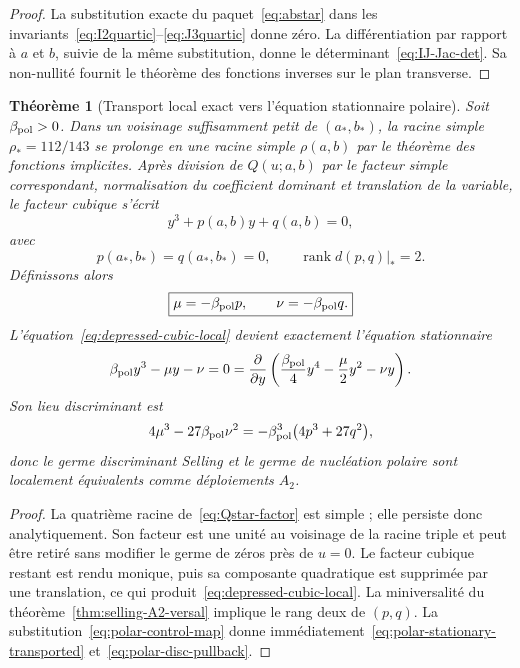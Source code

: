 \documentclass[11pt,a4paper]{article}
\newtheorem{theorem}{Théorème}[section]
\begin{document}
\begin{proof}
La substitution exacte du paquet~\eqref{eq:abstar} dans les invariants~\eqref{eq:I2quartic}--\eqref{eq:J3quartic} donne zéro. La différentiation par rapport à $a$ et $b$, suivie de la même substitution, donne le déterminant~\eqref{eq:IJ-Jac-det}. Sa non-nullité fournit le théorème des fonctions inverses sur le plan transverse.
\end{proof}

\begin{theorem}[Transport local exact vers l'équation stationnaire polaire]\label{thm:selling-to-polar-contact}
Soit $\beta_{\rm pol}>0$. Dans un voisinage suffisamment petit de $(a_*,b_*)$, la racine simple $\rho_*=112/143$ se prolonge en une racine simple $\rho(a,b)$ par le théorème des fonctions implicites. Après division de $Q(u;a,b)$ par le facteur simple correspondant, normalisation du coefficient dominant et translation de la variable, le facteur cubique s'écrit
\begin{equation}\label{eq:depressed-cubic-local}
 y^3+p(a,b)y+q(a,b)=0,
\end{equation}
avec
\[
 p(a_*,b_*)=q(a_*,b_*)=0,
 \qquad
 \operatorname{rank}d(p,q)|_*=2.
\]
Définissons alors
\begin{equation}\label{eq:polar-control-map}
 \boxed{\mu=-\beta_{\rm pol}p,\qquad \nu=-\beta_{\rm pol}q.}
\end{equation}
L'équation~\eqref{eq:depressed-cubic-local} devient exactement l'équation stationnaire
\begin{equation}\label{eq:polar-stationary-transported}
 \beta_{\rm pol}y^3-\mu y-\nu=0
 =\frac{\partial}{\partial y}
 \left(
 \frac{\beta_{\rm pol}}4y^4-\frac\mu2y^2-\nu y
 \right).
\end{equation}
Son lieu discriminant est
\begin{equation}\label{eq:polar-disc-pullback}
 4\mu^3-27\beta_{\rm pol}\nu^2
 =-\beta_{\rm pol}^3\bigl(4p^3+27q^2\bigr),
\end{equation}
donc le germe discriminant Selling et le germe de nucléation polaire sont localement équivalents comme déploiements $A_2$.
\end{theorem}

\begin{proof}
La quatrième racine de~\eqref{eq:Qstar-factor} est simple ; elle persiste donc analytiquement. Son facteur est une unité au voisinage de la racine triple et peut être retiré sans modifier le germe de zéros près de $u=0$. Le facteur cubique restant est rendu monique, puis sa composante quadratique est supprimée par une translation, ce qui produit~\eqref{eq:depressed-cubic-local}. La miniversalité du théorème~\ref{thm:selling-A2-versal} implique le rang deux de $(p,q)$. La substitution~\eqref{eq:polar-control-map} donne immédiatement~\eqref{eq:polar-stationary-transported} et~\eqref{eq:polar-disc-pullback}.
\end{proof}
\end{document}
